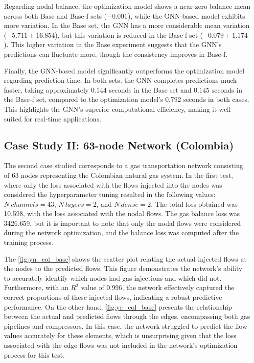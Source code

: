 Regarding nodal balance, the optimization model shows a near-zero balance mean across both Base and Base-f sets (\(-0.001\)), while the GNN-based model exhibits more variation. In the Base set, the GNN has a more considerable mean variation (\(-5.711 \pm 16.854\)), but this variation is reduced in the Base-f set (\(-0.079 \pm 1.174\)). This higher variation in the Base experiment suggests that the GNN's predictions can fluctuate more, though the consistency improves in Base-f.

Finally, the GNN-based model significantly outperforms the optimization model regarding prediction time. In both sets, the GNN completes predictions much faster, taking approximately \(0.144\) seconds in the Base set and \(0.145\) seconds in the Base-f set, compared to the optimization model's \(0.792\) seconds in both cases. This highlights the GNN's superior computational efficiency, making it well-suited for real-time applications.



\subsection{Case Study II: 63-node Network (Colombia)}


The second case studied corresponds to a gas transportation network consisting of 63 nodes representing the Colombian natural gas system. In the first test, where only the loss associated with the flows injected into the nodes was considered the hyperparameter tuning resulted in the following values: $N \ channels = 43$, $N \ layers = 2$, and $N \ dense = 2$. The total loss obtained was 10.598, with the loss associated with the nodal flows. The gas balance loss was 3426.659, but it is important to note that only the nodal flows were considered during the network optimization, and the balance loss was computed after the training process.

The \cref{fig:yn_col_base} shows the scatter plot relating the actual injected flows at the nodes to the predicted flows. This figure demonstrates the network's ability to accurately identify which nodes had gas injections and which did not. Furthermore, with an $R^2$ value of 0.996, the network effectively captured the correct proportions of these injected flows, indicating a robust predictive performance. 
On the other hand, \cref{fig:ye_col_base} presents the relationship between the actual and predicted flows through the edges, encompassing both gas pipelines and compressors. In this case, the network struggled to predict the flow values accurately for these elements, which is unsurprising given that the loss associated with the edge flows was not included in the network's optimization process for this test.

